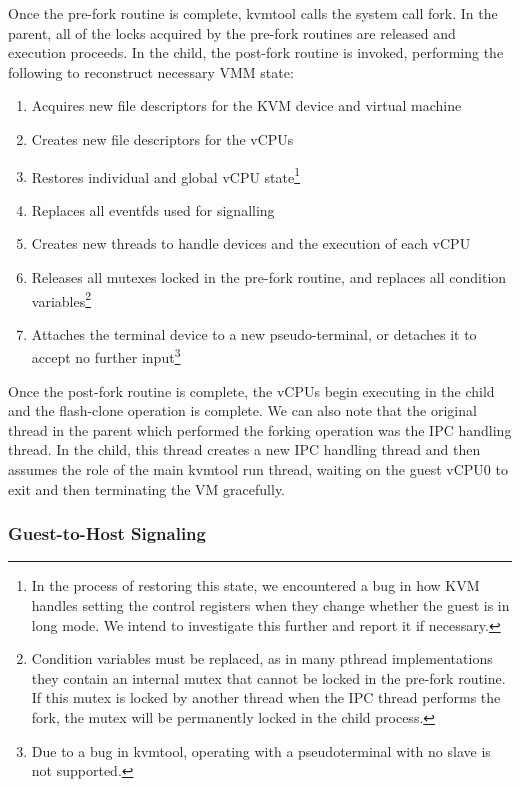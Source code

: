 Once the pre-fork routine is complete, kvmtool calls the system call fork. In
the parent, all of the locks acquired by the pre-fork routines are released and
execution proceeds. In the child, the post-fork routine is invoked, performing
the following to reconstruct necessary VMM state:

\begin{enumerate}
\item Acquires new file descriptors for the KVM device and virtual machine
\item Creates new file descriptors for the vCPUs
\item Restores individual and global vCPU state\footnote{In the process of
restoring this state, we encountered a bug in how KVM handles setting the
control registers when they change whether the guest is in long mode. We intend
to investigate this further and report it if necessary.}
\item Replaces all eventfds used for signalling
\item Creates new threads to handle devices and the execution of each vCPU
\item Releases all mutexes locked in the pre-fork routine, and replaces all
condition variables\footnote{Condition variables must be replaced, as in many
pthread implementations they contain an internal mutex that cannot be locked in
the pre-fork routine. If this mutex is locked by another thread when the IPC
thread performs the fork, the mutex will be permanently locked in the child
process.}
\item Attaches the terminal device to a new pseudo-terminal, or detaches it to
accept no further input\footnote{Due to a bug in kvmtool, operating with a
pseudoterminal with no slave is not supported.}
\end{enumerate}

Once the post-fork routine is complete, the vCPUs begin executing in the child
and the flash-clone operation is complete. We can also note that the original
thread in the parent which performed the forking operation was the IPC handling
thread. In the child, this thread creates a new IPC handling thread and then
assumes the role of the main kvmtool run thread, waiting on the guest vCPU0 to
exit and then terminating the VM gracefully.

\subsubsection{Guest-to-Host Signaling}

